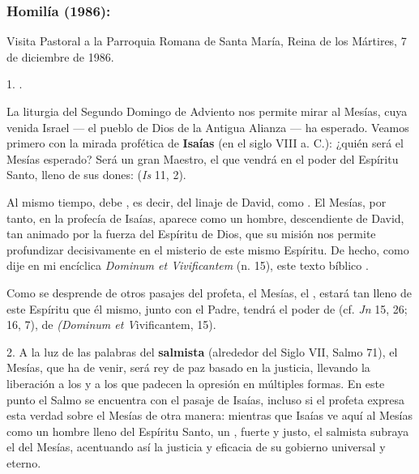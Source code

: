 \begin{body}
	\subsubsection{Homilía (1986):}

	Visita Pastoral a la Parroquia Romana de Santa María, Reina de los Mártires, 7 de diciembre de 1986.

	\begin{body}
		1. .

		La liturgia del Segundo Domingo de Adviento nos permite mirar al Mesías, cuya venida Israel --- el pueblo de Dios de la Antigua Alianza --- ha esperado. Veamos primero con la mirada profética de \textbf{Isaías} (en el siglo VIII a. C.): ¿quién será el Mesías esperado? Será un gran Maestro, el que vendrá en el poder del Espíritu Santo, lleno de sus dones:  (\emph{Is} 11, 2).

		Al mismo tiempo, debe , es decir, del linaje de David, como . El Mesías, por tanto, en la profecía de Isaías, aparece como un hombre, descendiente de David, tan animado por la fuerza del Espíritu de Dios, que su misión nos permite profundizar decisivamente en el misterio de este mismo Espíritu. De hecho, como dije en mi encíclica \emph{Dominum et Vivificantem} (n. 15), este texto bíblico .

		Como se desprende de otros pasajes del profeta, el Mesías, el , estará tan lleno de este Espíritu que él mismo, junto con el Padre, tendrá el poder de  (cf. \emph{Jn} 15, 26; 16, 7), de  \emph{(Dominum et V}ivificantem, 15).

		2. A la luz de las palabras del \textbf{salmista} (alrededor del Siglo VII, Salmo 71), el Mesías, que ha de venir, será rey de paz basado en la justicia, llevando la liberación a los  y a los que padecen la opresión en múltiples formas. En este punto el Salmo se encuentra con el pasaje de Isaías, incluso si el profeta expresa esta verdad sobre el Mesías de otra manera: mientras que Isaías ve aquí al Mesías como un hombre lleno del Espíritu Santo, un , fuerte y justo, el salmista subraya el  del Mesías, acentuando así la justicia y eficacia de su gobierno universal y eterno.


\end{body}
\end{body}
